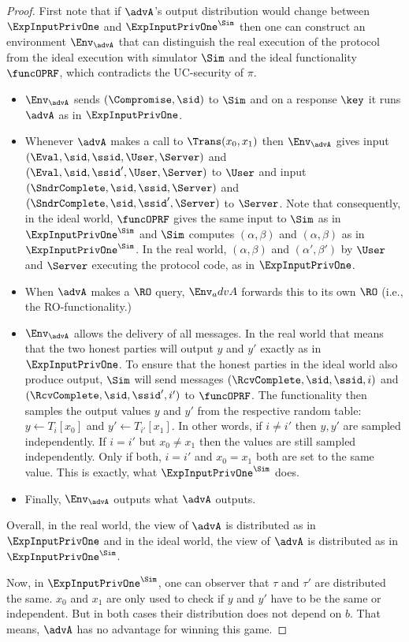 \begin{proof}
    First note that if $\advA$'s output distribution would change between $\ExpInputPrivOne$ and $\ExpInputPrivOne^\Sim$ then one can construct an environment $\Env_\advA$ that can distinguish the real execution of the protocol from the ideal execution with simulator $\Sim$ and the ideal functionality $\funcOPRF$, which contradicts the UC-security of $\pi$. 
    
    \begin{itemize}
        \item $\Env_\advA$ sends $(\Compromise,\sid)$ to $\Sim$ and on a response $\key$ it runs $\advA$ as in $\ExpInputPrivOne$.
        \item Whenever $\advA$ makes a call to $\Trans(x_0,x_1)$ then $\Env_\advA$ gives input $(\Eval,\sid,\ssid,\User,\Server)$ and $(\Eval,\sid,\ssid',\User,\Server)$ to $\User$ and input $(\SndrComplete,\sid,\ssid,\Server)$ and $(\SndrComplete,\sid,\ssid',\Server)$ to $\Server$.
        Note that consequently, in the ideal world, $\funcOPRF$ gives the same input to $\Sim$ as in $\ExpInputPrivOne^\Sim$ and $\Sim$ computes $(\alpha,\beta)$ and $(\alpha,\beta)$ as in $\ExpInputPrivOne^\Sim$. 
        In the real world, $(\alpha,\beta)$ and $(\alpha',\beta')$ by $\User$ and $\Server$ executing the protocol code, as in $\ExpInputPrivOne$. 
        \item When $\advA$ makes a $\RO$ query, $\Env_advA$ forwards this to its own $\RO$ (i.e., the RO-functionality.)
        \item $\Env_\advA$ allows the delivery of all messages. 
        In the real world that means that the two honest parties will output $y$ and $y'$ exactly as in $\ExpInputPrivOne$. 
        To ensure that
        the honest parties in the ideal world also produce output, $\Sim$ will send messages $(\RcvComplete,\sid,\ssid,i)$ and $(\RcvComplete,\sid,\ssid',i')$ to $\funcOPRF$. 
        The functionality then samples the output values $y$ and $y'$ from the respective random table: $y\gets T_i[x_0]$ and $y'\gets T_{i'}[x_1]$. 
        In other words, if $i\neq i'$ then $y,y'$ are sampled independently. 
        If $i=i'$ but $x_0\neq x_1$ then the values are still sampled independently. 
        Only if both, $i=i'$ and $x_0=x_1$ both are set to the same value. This is exactly, what $\ExpInputPrivOne^\Sim$ does. 
        \item Finally, $\Env_\advA$ outputs what $\advA$ outputs.
    \end{itemize}
    Overall, in the real world, the view of $\advA$ is distributed as in $\ExpInputPrivOne$ and in the ideal world, the view of $\advA$ is distributed as in $\ExpInputPrivOne^\Sim$.

    Now, in $\ExpInputPrivOne^\Sim$, one can observer that $\tau$ and $\tau'$ are distributed the same.
    $x_0$ and $x_1$ are only used to check if $y$ and $y'$ have to be the same or independent. But in both cases their distribution does not depend on $b$.
    That means, $\advA$ has no advantage for winning this game.
\end{proof}

